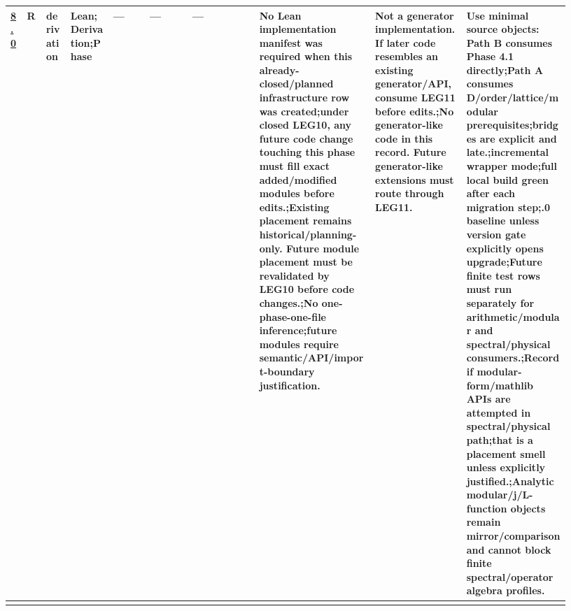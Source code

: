 \begin{longtable}{L{0.026\linewidth} L{0.024\linewidth} L{0.045\linewidth} L{0.07\linewidth} L{0.065\linewidth} L{0.075\linewidth} L{0.11\linewidth} L{0.19\linewidth} L{0.155\linewidth} L{0.17\linewidth}}
\hline
\addlinespace[0.24em]
\hyperlink{phase-row-8-0}{8.0} & R & derivation & Lean;\newline Derivation;\newline Phase & --- & --- & --- & No Lean implementation manifest was required when this already-closed/\allowbreak{}planned infrastructure row was created;\newline under closed LEG10, any future code change touching this phase must fill exact added/\allowbreak{}modified modules before edits.;\newline Existing placement remains historical/\allowbreak{}planning-only. Future module placement must be revalidated by LEG10 before code changes.;\newline No one-phase-one-file inference;\newline future modules require semantic/\allowbreak{}API/\allowbreak{}import-boundary justification. & Not a generator implementation. If later code resembles an existing generator/\allowbreak{}API, consume LEG11 before edits.;\newline No generator-like code in this record. Future generator-like extensions must route through LEG11. & Use minimal source objects: Path B consumes Phase 4.1 directly;\newline Path A consumes D/\allowbreak{}order/\allowbreak{}lattice/\allowbreak{}modular prerequisites;\newline bridges are explicit and late.;\newline incremental wrapper mode;\newline full local build green after each migration step;.0 baseline unless version gate explicitly opens upgrade;\newline Future finite test rows must run separately for arithmetic/\allowbreak{}modular and spectral/\allowbreak{}physical consumers.;\newline Record if modular-form/\allowbreak{}mathlib APIs are attempted in spectral/\allowbreak{}physical path;\newline that is a placement smell unless explicitly justified.;\newline Analytic modular/\allowbreak{}j/\allowbreak{}L-function objects remain mirror/\allowbreak{}comparison and cannot block finite spectral/\allowbreak{}operator algebra profiles.\\
\hline
\addlinespace[0.24em]

\end{longtable}
